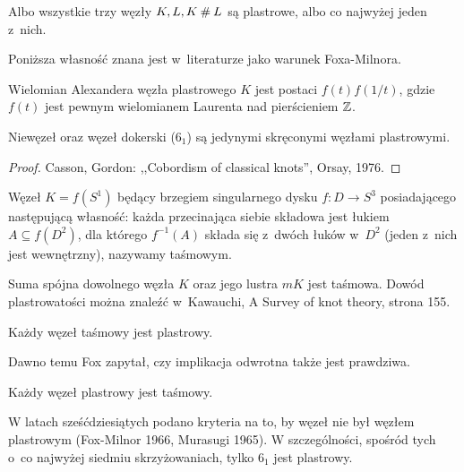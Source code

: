 \begin{proposition}
    Albo wszystkie trzy węzły $K, L, K \mathbin{\#} L$ są plastrowe, albo co najwyżej jeden z~nich.
\end{proposition}

Poniższa własność znana jest w~literaturze jako warunek Foxa-Milnora.

\begin{proposition}
    Wielomian Alexandera węzła plastrowego $K$ jest postaci $f(t) f(1/t)$, gdzie $f(t)$ jest pewnym wielomianem Laurenta nad pierścieniem $\mathbb Z$.
\end{proposition}

\begin{theorem}
    Niewęzeł oraz węzeł dokerski ($6_1$) są jedynymi skręconymi węzłami plastrowymi.
\end{theorem}

\begin{proof}
    Casson, Gordon: ,,Cobordism of classical knots'', Orsay, 1976.
\end{proof}

\begin{definition}
    Węzeł $K = f(S^1)$ będący brzegiem singularnego dysku $f \colon D \to S^3$ posiadającego następującą własność: każda przecinająca siebie składowa jest łukiem $A \subseteq f(D^2)$, dla którego $f^{-1}(A)$ składa się z~dwóch łuków w~$D^2$ (jeden z~nich jest wewnętrzny), nazywamy taśmowym.
\end{definition}

Suma spójna dowolnego węzła $K$ oraz jego lustra $mK$ jest taśmowa.
Dowód plastrowatości można znaleźć w~Kawauchi, A Survey of knot theory, strona 155.

\begin{proposition}
    Każdy węzeł taśmowy jest plastrowy.
\end{proposition}

Dawno temu Fox zapytał, czy implikacja odwrotna także jest prawdziwa.

\begin{conjecture}[Fox, 1958]
    Każdy węzeł plastrowy jest taśmowy.
\end{conjecture}

W latach sześćdziesiątych podano kryteria na to, by węzeł nie był węzłem plastrowym (Fox-Milnor 1966, Murasugi 1965).
W szczególności, spośród tych o~co najwyżej siedmiu skrzyżowaniach, tylko $6_1$ jest plastrowy.

